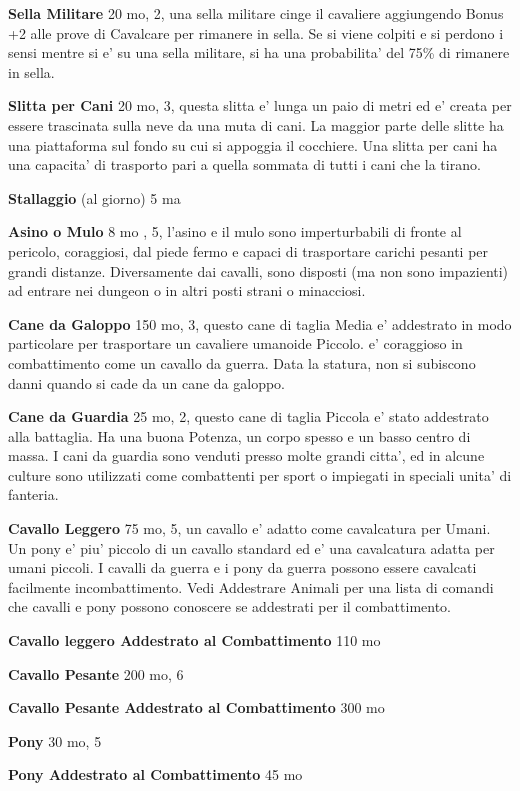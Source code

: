 \documentclass[a4paper,11pt,twoside,openany]{book}
\begin{document}
{\textbf{Sella Militare} 20 mo, 2, una sella militare cinge il cavaliere aggiungendo Bonus +2 alle prove di Cavalcare per rimanere in sella. Se si viene colpiti e si perdono i sensi mentre si e' su una sella militare, si ha una probabilita' del 75\% di rimanere in sella.

\textbf{Slitta per Cani} 20 mo, 3, questa slitta e' lunga un paio di metri ed e' creata per essere trascinata sulla neve da una muta di cani. La maggior parte delle slitte ha una piattaforma sul fondo su cui si appoggia il cocchiere.
Una slitta per cani ha una capacita' di trasporto pari a quella sommata di tutti i cani che la tirano.

\textbf{Stallaggio} (al giorno) 5 ma 

\textbf{Asino o Mulo} 8 mo , 5, l'asino e il mulo sono imperturbabili di fronte al pericolo, coraggiosi, dal piede fermo e capaci di trasportare carichi pesanti per grandi distanze. Diversamente dai cavalli, sono disposti (ma non sono impazienti) ad entrare nei dungeon o in altri posti strani o minacciosi.

\textbf{Cane da Galoppo} 150 mo, 3, questo cane di taglia Media e' addestrato in modo particolare per trasportare un cavaliere umanoide Piccolo. e' coraggioso in combattimento come un cavallo da guerra. Data la statura, non si subiscono danni quando si cade da un cane da galoppo.

\textbf{Cane da Guardia} 25 mo, 2, questo cane di taglia Piccola e' stato addestrato alla battaglia. Ha una buona Potenza, un corpo spesso e un basso centro di massa. I cani da guardia sono venduti presso molte grandi citta', ed in alcune culture sono utilizzati come combattenti per sport o impiegati in speciali unita' di fanteria.

\textbf{Cavallo Leggero} 75 mo, 5, un cavallo e' adatto come cavalcatura per Umani. Un pony e' piu' piccolo di un cavallo standard ed e' una cavalcatura adatta per umani piccoli. I cavalli da guerra e i pony da guerra possono essere cavalcati facilmente incombattimento.
Vedi Addestrare Animali per una lista di comandi che cavalli e pony possono conoscere se addestrati per il combattimento.

\textbf{Cavallo leggero Addestrato al Combattimento} 110 mo

\textbf{Cavallo Pesante} 200 mo, 6

\textbf{Cavallo Pesante Addestrato al Combattimento} 300 mo

\textbf{Pony} 30 mo, 5

\textbf{Pony Addestrato al Combattimento} 45 mo

}
\end{document}
